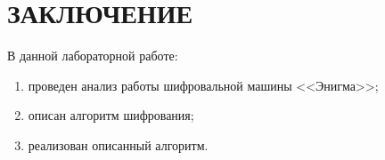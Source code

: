 \chapter*{ЗАКЛЮЧЕНИЕ}

В данной лабораторной работе:

\begin{enumerate}[label=---]
    \item проведен анализ работы шифровальной машины <<Энигма>>;
    \item описан алгоритм шифрования;
    \item реализован описанный алгоритм.
\end{enumerate}
